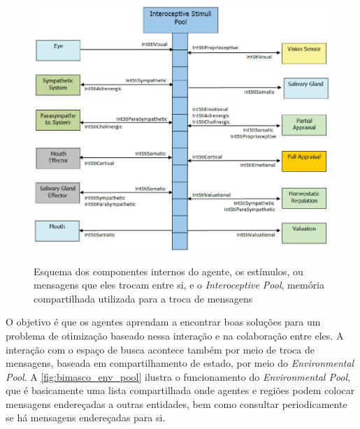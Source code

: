 \begin{figure}
    \centering
    \caption{Esquema dos componentes internos do agente, os estímulos, ou mensagens que eles trocam entre si, e o \textit{Interoceptive Pool}, memória compartilhada utilizada para a troca de mensagens}
    \includegraphics[scale=0.6]{imagens/interoceptive-pool-saliba.eps}
    \label{fig:interoceptive_pool_saliba}
\end{figure}

O objetivo é que os agentes aprendam a encontrar boas soluções para um problema de otimização baseado nessa interação e na colaboração entre eles. A interação com o espaço de busca acontece também por meio de troca de mensagens,  baseada em compartilhamento de estado, por meio do \textit{Environmental Pool}. A \autoref{fig:bimasco_env_pool} ilustra o funcionamento do \textit{Environmental Pool}, que é basicamente uma lista compartilhada onde agentes e regiões podem colocar mensagens endereçadas a outras entidades, bem como consultar periodicamente se há mensagens endereçadas para si.

